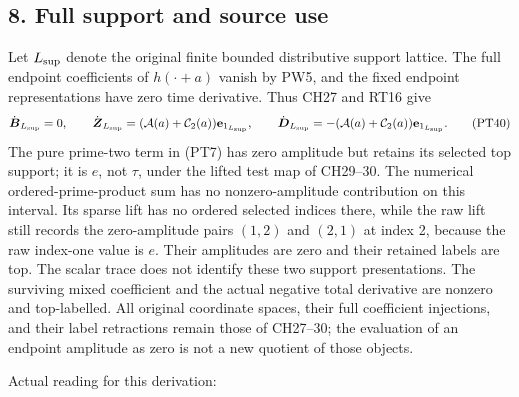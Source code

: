 \documentclass[
  10pt,
  a4paper,
]{article}
\begin{document}
\subsection{8. Full support and source
use}\label{full-support-and-source-use}

Let \(L_{\rm sup}\) denote the original finite bounded distributive
support lattice. The full endpoint coefficients of \(h(\cdot+a)\) vanish
by PW5, and the fixed endpoint representations have zero time
derivative. Thus CH27 and RT16 give \[
\dot{\boldsymbol B}_{L_{\rm sup}}=0,\qquad
\dot{\boldsymbol Z}_{L_{\rm sup}}
=(\mathcal A(a)+\mathcal C_2(a))\mathbf e_{1_{L_{\rm sup}}},\qquad
\dot{\boldsymbol D}_{L_{\rm sup}}
=-(\mathcal A(a)+\mathcal C_2(a))\mathbf e_{1_{L_{\rm sup}}}.
\tag{PT40}
\] The pure prime-two term in (PT7) has zero amplitude but retains its
selected top support; it is \(e\), not \(\tau\), under the lifted test
map of CH29--30. The numerical ordered-prime-product sum has no
nonzero-amplitude contribution on this interval. Its sparse lift has no
ordered selected indices there, while the raw lift still records the
zero-amplitude pairs \((1,2)\) and \((2,1)\) at index 2, because the raw
index-one value is \(e\). Their amplitudes are zero and their retained
labels are top. The scalar trace does not identify these two support
presentations. The surviving mixed coefficient and the actual negative
total derivative are nonzero and top-labelled. All original coordinate
spaces, their full coefficient injections, and their label retractions
remain those of CH27--30; the evaluation of an endpoint amplitude as
zero is not a new quotient of those objects.

Actual reading for this derivation:
\end{document}
